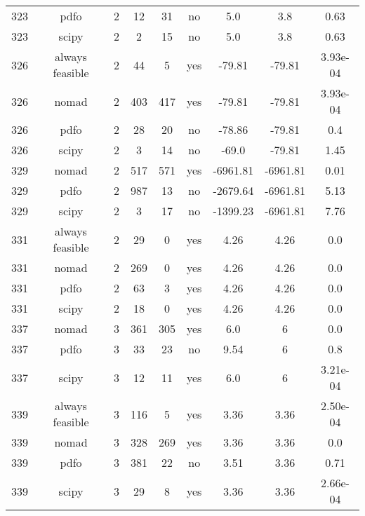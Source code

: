 \begin{scriptsize}
\begin{center}
\begin{longtable}{ccccccccc}
323 &            pdfo &  2 &     12 &     31 &      no &         5.0 &         3.8 &     0.63\\
323 &           scipy &  2 &      2 &     15 &      no &         5.0 &         3.8 &     0.63\\
326 & always feasible &  2 &     44 &      5 &     yes &      -79.81 &      -79.81 & 3.93e-04\\
326 &           nomad &  2 &    403 &    417 &     yes &      -79.81 &      -79.81 & 3.93e-04\\
326 &            pdfo &  2 &     28 &     20 &      no &      -78.86 &      -79.81 &      0.4\\
326 &           scipy &  2 &      3 &     14 &      no &       -69.0 &      -79.81 &     1.45\\
329 &           nomad &  2 &    517 &    571 &     yes &    -6961.81 &    -6961.81 &     0.01\\
329 &            pdfo &  2 &    987 &     13 &      no &    -2679.64 &    -6961.81 &     5.13\\
329 &           scipy &  2 &      3 &     17 &      no &    -1399.23 &    -6961.81 &     7.76\\
331 & always feasible &  2 &     29 &      0 &     yes &        4.26 &        4.26 &      0.0\\
331 &           nomad &  2 &    269 &      0 &     yes &        4.26 &        4.26 &      0.0\\
331 &            pdfo &  2 &     63 &      3 &     yes &        4.26 &        4.26 &      0.0\\
331 &           scipy &  2 &     18 &      0 &     yes &        4.26 &        4.26 &      0.0\\
337 &           nomad &  3 &    361 &    305 &     yes &         6.0 &           6 &      0.0\\
337 &            pdfo &  3 &     33 &     23 &      no &        9.54 &           6 &      0.8\\
337 &           scipy &  3 &     12 &     11 &     yes &         6.0 &           6 & 3.21e-04\\
339 & always feasible &  3 &    116 &      5 &     yes &        3.36 &        3.36 & 2.50e-04\\
339 &           nomad &  3 &    328 &    269 &     yes &        3.36 &        3.36 &      0.0\\
339 &            pdfo &  3 &    381 &     22 &      no &        3.51 &        3.36 &     0.71\\
339 &           scipy &  3 &     29 &      8 &     yes &        3.36 &        3.36 & 2.66e-04\\

\end{longtable}
\end{center}
\end{scriptsize}
